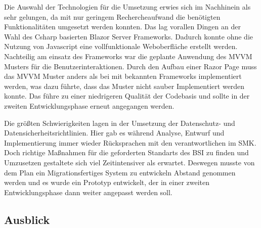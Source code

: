Die Auswahl der Technologien für die Umsetzung erwies sich im Nachhinein als sehr gelungen, da mit nur geringem Rechercheaufwand die benötigten Funktionalitäten umgesetzt werden konnten. Das lag vorallen Dingen an der Wahl des Csharp basierten Blazor Server Frameworks. Dadurch konnte ohne die Nutzung von Javascript eine vollfunktionale Weboberfläche erstellt werden. Nachteilig am einsatz des Frameworks war die geplante Anwendung des MVVM Musters für die Benutzerinteraktionen. Durch den Aufbau einer Razor Page muss das MVVM Muster anders als bei mit bekannten Frameworks implementiert werden, was dazu führte, dass das Muster nicht sauber Implementiert werden konnte. Das führe zu einer niedrigeren Qualität der Codebasis und sollte in der zweiten Entwicklungsphase erneut angegangen werden.

Die größten Schwierigkeiten lagen in der Umsetzung der Datenschutz- und Datensicherheitsrichtlinien. Hier gab es während Analyse, Entwurf und Implementierung immer wieder Rücksprachen mit den verantwortlichen im SMK. Doch richtige Maßnahmen für die geforderten Standarts des BSI zu finden und Umzusetzen gestaltete sich viel Zeitintensiver als erwartet. Deswegen musste von dem Plan ein Migrationsfertiges System zu entwickeln Abstand genommen werden und es wurde ein Prototyp entwickelt, der in einer zweiten Entwicklungsphase dann weiter angepasst werden soll.

\subsection{Ausblick}
\label{sec:Ausblick}



